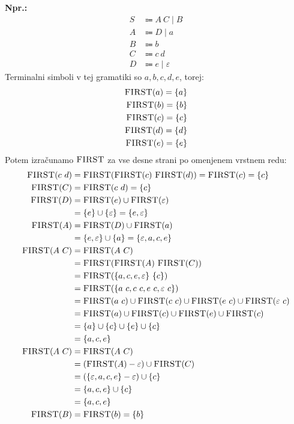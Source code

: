 \documentclass{article}
\newcommand{\Ex}{\textbf{Npr.:}\ }
\newcommand{\FIRST}{\textsc{FIRST}}
\newcommand{\Null}{\varepsilon}
\newcommand{\Arrow}{\Coloneqq}
\newcommand{\Seq}{\ }
\newcommand{\Union}{\mathrel{|}}
\begin{document}
\Ex
\begin{equation*}
  \begin{aligned}
    S &\Arrow A \Seq C \Union B \\
    A &\Arrow D \Union a \\
    B &\Arrow b\\
    C &\Arrow c \Seq d\\
    D &\Arrow e \Union \Null
  \end{aligned}
\end{equation*}
Terminalni simboli v tej gramatiki so $a, b, c, d, e$, torej:
\begin{align*}
  \FIRST(a) = \{a\}\\
  \FIRST(b) = \{b\}\\
  \FIRST(c) = \{c\}\\
  \FIRST(d) = \{d\}\\
  \FIRST(e) = \{e\}
\end{align*}
Potem izračunamo $\FIRST$ za vse desne strani po omenjenem vrstnem redu:
\begin{align*}
  \FIRST(c \Seq d) &= \FIRST(\FIRST(c) \Seq \FIRST(d)) = \FIRST(c) = \{c\} \\
  \FIRST(C) &= \FIRST(c \Seq d) = \{c\} \\
  \FIRST(D) &= \FIRST(e) \cup \FIRST(\Null) \\
            &= \{e\} \cup \{\Null\} = \{e, \Null\} \\
  \FIRST(A) &= \FIRST(D) \cup \FIRST(a) \\
            &= \{e, \Null\} \cup \{a\} = \{\Null, a, c, e\} \\
  \FIRST(A \Seq C) &= \FIRST(A \Seq C) \\
            &= \FIRST(\FIRST(A) \Seq \FIRST(C)) \\
            &= \FIRST(\{a, c, e, \Null\} \Seq \{c\})\\
            &= \FIRST(\{a \Seq c, c \Seq c, e \Seq c, \Null \Seq c\})\\
            &= \FIRST(a \Seq c) \cup \FIRST(c \Seq c) \cup \FIRST(e \Seq c) \cup \FIRST(\Null \Seq c)\\
            &= \FIRST(a) \cup \FIRST(c) \cup \FIRST(e) \cup \FIRST(c) \\
            &= \{a\} \cup \{c\} \cup \{e\} \cup \{c\}\\
            &= \{a, c, e\}\\
  \FIRST(A \Seq C) &= \FIRST(A \Seq C) \\
            &= (\FIRST(A) - \Null) \cup \FIRST(C) \\
            &= (\{\Null, a, c, e\} - \Null) \cup \{c\} \\
            &= \{a, c, e\} \cup \{c\}\\
            &= \{a, c, e\}\\
  \FIRST(B) &= \FIRST(b) = \{b\}
\end{align*}
\end{document}
